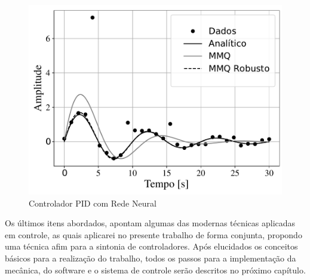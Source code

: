 \begin{figure}[H]
  \caption{Controlador PID com Rede Neural}
  \begin{center}
      \includegraphics[scale=0.7]{referencial/img/robust_regression}
  \end{center}
  \label{fig:robust_regression}
\end{figure}

Os últimos itens abordados, apontam algumas das modernas técnicas aplicadas em controle, as quais aplicarei no presente trabalho de forma conjunta, propondo uma técnica afim para a sintonia de controladores. Após elucidados os conceitos básicos para a realização do trabalho, todos os passos para a implementação da mecânica, do software e o sistema de controle serão descritos no próximo capítulo.